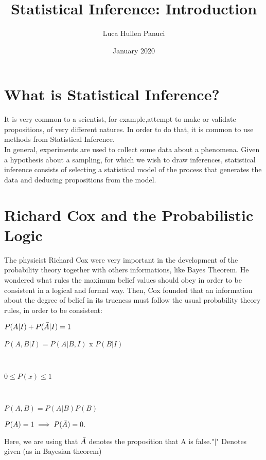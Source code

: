 \documentclass[oneside]{book}
\title{Statistical Inference:  Introduction}
\author{Luca Hullen Panuci}
\date{January 2020}
\begin{document}
\maketitle

\section*{What is Statistical Inference?}

It is very common to a scientist, for example,attempt to make or validate propositions, of very different natures. In order to do that, it is common to use methods from Statistical Inference.\\

In general, experiments are used to collect some data about a phenomena. Given a hypothesis about a sampling, for which we wish to draw inferences, statistical inference consists of selecting a statistical model of the process that generates the data and deducing propositions from the model. 
\section*{Richard Cox and the Probabilistic Logic}

The physicist Richard Cox were very important in the development of the probability theory together with others informations, like Bayes Theorem. He wondered what rules the maximum belief values should obey in order to be consistent in a logical and formal way. Then, Cox founded that an information about the degree of  belief in its trueness must follow the usual probability theory rules, in order to be consistent:\\
\begin{center}
$P(A|I) + P(\Bar{A}|I)= 1$
\\
\end{center}
\begin{center}
    $P(A,B|I) = P(A|B,I)$ x $P(B|I)$
    
\end{center}
\\
\begin{center}
    $0 \leq P(x) \leq 1$ 
\end{center}
\\
\begin{center}
    $P(A,B) = P(A|B)P(B)$
\end{center}
\begin{center}
    $P(A)=1 \implies P(\Bar{A})=0.$
\end{center}
Here, we are using that $\Bar{A}$ denotes the proposition that A is false."$|$" Denotes given (as in Bayesian theorem)\\
\end{document}

